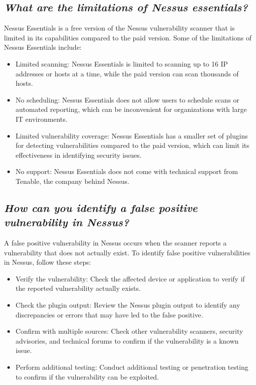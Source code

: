 \documentclass{article}
\begin{document}
\subsection{\textit{What are the limitations of Nessus essentials?}}
Nessus Essentials is a free version of the Nessus vulnerability scanner that is limited in its capabilities compared to the paid version. Some of the limitations of Nessus Essentials include:
\begin{itemize}
	\item Limited scanning: Nessus Essentials is limited to scanning up to 16 IP addresses or hosts at a time, while the paid version can scan thousands of hosts.
	\item No scheduling: Nessus Essentials does not allow users to schedule scans or automated reporting, which can be inconvenient for organizations with large IT environments.
	\item Limited vulnerability coverage: Nessus Essentials has a smaller set of plugins for detecting vulnerabilities compared to the paid version, which can limit its effectiveness in identifying security issues.
	\item No support: Nessus Essentials does not come with technical support from Tenable, the company behind Nessus.
	
\end{itemize}
\subsection{\textit{How can you identify a false positive vulnerability in Nessus?}}
A false positive vulnerability in Nessus occurs when the scanner reports a vulnerability that does not actually exist. To identify false positive vulnerabilities in Nessus, follow these steps:
\begin{itemize}
	\item Verify the vulnerability: Check the affected device or application to verify if the reported vulnerability actually exists.
	\item Check the plugin output: Review the Nessus plugin output to identify any discrepancies or errors that may have led to the false positive.
	\item Confirm with multiple sources: Check other vulnerability scanners, security advisories, and technical forums to confirm if the vulnerability is a known issue.
	\item Perform additional testing: Conduct additional testing or penetration testing to confirm if the vulnerability can be exploited.

\end{itemize}
\end{document}

